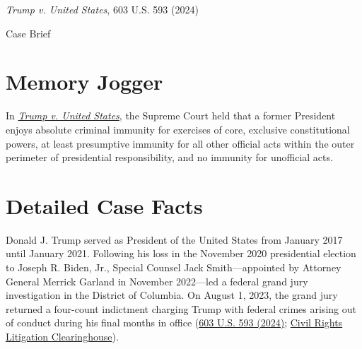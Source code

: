\documentclass[12pt]{article}
\begin{document}
\begin{center}
{\LARGE \textit{Trump v. United States}, 603 U.S. 593 (2024)\par}
\vspace{0.8em}
{\large Case Brief\par}
\end{center}
\vspace{1em}

\section{Memory Jogger}

In \href{https://www.courtlistener.com/opinion/10600038/trump-v-united-states/}{\textit{Trump v. United States}}, the Supreme Court held that a former President enjoys absolute criminal immunity for exercises of core, exclusive constitutional powers, at least presumptive immunity for all other official acts within the outer perimeter of presidential responsibility, and no immunity for unofficial acts.

\section{Detailed Case Facts}

Donald J. Trump served as President of the United States from January 2017 until January 2021. Following his loss in the November 2020 presidential election to Joseph R. Biden, Jr., Special Counsel Jack Smith---appointed by Attorney General Merrick Garland in November 2022---led a federal grand jury investigation in the District of Columbia. On August 1, 2023, the grand jury returned a four-count indictment charging Trump with federal crimes arising out of conduct during his final months in office (\href{https://www.law.cornell.edu/supremecourt/text/23-939}{603 U.S. 593 (2024)}; \href{https://clearinghouse.net/case/46788/}{Civil Rights Litigation Clearinghouse}).
\end{document}
